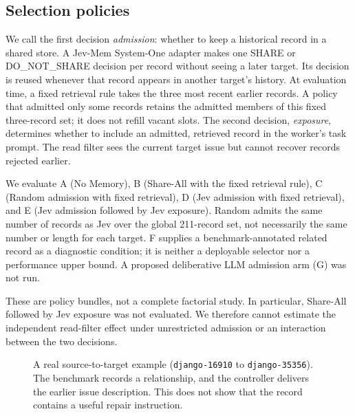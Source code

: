 \documentclass[sigconf,anonymous]{aamas}
\begin{document}
\subsection{Selection policies}
We call the first decision \emph{admission}: whether to keep a historical record in a shared store. A Jev-Mem System-One adapter makes one SHARE or DO\_NOT\_SHARE decision per record without seeing a later target. Its decision is reused whenever that record appears in another target's history. At evaluation time, a fixed retrieval rule takes the three most recent earlier records. A policy that admitted only some records retains the admitted members of this fixed three-record set; it does not refill vacant slots. The second decision, \emph{exposure}, determines whether to include an admitted, retrieved record in the worker's task prompt. The read filter sees the current target issue but cannot recover records rejected earlier.

We evaluate A (No Memory), B (Share-All with the fixed retrieval rule), C (Random admission with fixed retrieval), D (Jev admission with fixed retrieval), and E (Jev admission followed by Jev exposure). Random admits the same number of records as Jev over the global 211-record set, not necessarily the same number or length for each target. F supplies a benchmark-annotated related record as a diagnostic condition; it is neither a deployable selector nor a performance upper bound. A proposed deliberative LLM admission arm (G) was not run.

These are policy bundles, not a complete factorial study. In particular, Share-All followed by Jev exposure was not evaluated. We therefore cannot estimate the independent read-filter effect under unrestricted admission or an interaction between the two decisions.

\begin{figure}[t]
\centering
{}
\caption{A real source-to-target example (\texttt{django-16910} to \texttt{django-35356}). The benchmark records a relationship, and the controller delivers the earlier issue description. This does not show that the record contains a useful repair instruction.}
\label{fig:example}
\end{figure}
\end{document}
